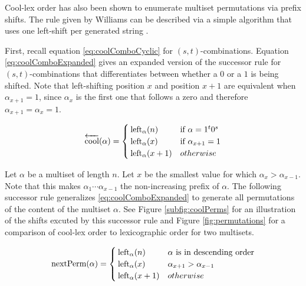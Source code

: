 Cool-lex order has also been shown to enumerate multiset permutations via prefix shifts.  The rule given by Williams can be described via a simple algorithm that uses one left-shift per generated string  \cite{williams2009loopless}.

First, recall equation \eqref{eq:coolComboCyclic} for $(s,t)$-combinations.  Equation \eqref{eq:coolComboExpanded} gives an expanded version of the successor rule for $(s,t)$-combinations that differentiates between whether a $0$ or a $1$ is being shifted. Note that left-shifting position $x$ and position $x+1$ are equivalent when $\alpha_{x+1}=1$, since $\alpha_{x}$ is the first one that follows a zero and therefore $\alpha_{x+1}=\alpha_{x}=1$.

\begin{equation} \label{eq:coolComboExpanded}
    \overleftarrow{\text{cool}}(\alpha) = \begin{cases}
	\leftshift[\alpha]{n} & \text{if $\alpha=1^t0^s$}\\
	\leftshift[\alpha]{x} & \text{if $\alpha_{x+1}=1$}\\
	\leftshift[\alpha]{x+1} & otherwise\\
\end{cases}
\end{equation}


 Let $\alpha$ be a multiset of length $n$.
 Let $x$ be the smallest value for which $\alpha_{x} > \alpha_{x-1}$.  Note that this makes $\alpha_{1}\cdots\alpha_{x-1}$ the non-increasing prefix of $\alpha$.  The following successor rule generalizes \eqref{eq:coolComboExpanded} to generate all permutations of the content of the multiset $\alpha$.  See Figure \ref{subfig:coolPerms} for an illustration of the shifts excuted by this successor rule and Figure \ref{fig:permutations} for a comparison of cool-lex order to lexicographic order for two multisets.

\begin{equation}\label{eq:coolPerms}
    \text{nextPerm}(\alpha) = \begin{cases}
	\leftshift[\alpha]{n} & \text{$\alpha$ is in descending order}\\
	\leftshift[\alpha]{x} & \alpha_{x+1} > \alpha_{x-1}\\
	\leftshift[\alpha]{x+1} & otherwise\\
\end{cases}
\end{equation}

